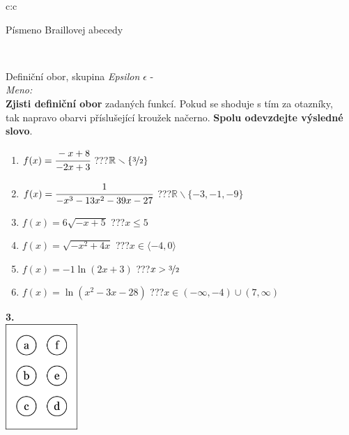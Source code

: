 \documentclass[10pt]{report}
\begin{document}
\begin{tabular}{c:c}
\begin{minipage}[c][99mm][t]{0.49\linewidth}
\begin{center}
\begin{minipage}{0.20\linewidth}
\begin{center}
{\small Písmeno Braillovej abecedy}
\end{center}
\end{minipage}
\end{center}
\end{minipage}
\\ \hdashline
\begin{minipage}[c][99mm][t]{0.49\linewidth}
\begin{center}
\vspace{7mm}
{\huge Definiční obor, skupina \textit{Epsilon $\epsilon$} -}\\[4.5mm]
\textit{Meno:}\phantom{xxxxxxxxxxxxxxxxxxxxxxxxxxxxxxxxxxxxxxxxxxxxxxxxxxxxxxxxxxxxxxxxx}\\[3.5mm]
\textbf{Zjisti definiční obor} zadaných funkcí. Pokud se shoduje s tím za otazníky,\\tak napravo obarvi příslušející kroužek načerno. \textbf{Spolu odevzdejte výsledné slovo}.\\[3mm]
\begin{minipage}{0.77\linewidth}
\begin{center}
\begin{varwidth}{\textwidth}
\begin{enumerate}
\normalsize
\item $f(x)=\cfrac{-x+8}{-2x+3}$\quad \dotfill\; ???\;\dotfill \quad $\mathbb{R}\smallsetminus\{\nicefrac{3}{2}\}$
\item $f(x)=\cfrac{1}{-x^3-13x^2-39x-27}$\quad \dotfill\; ???\;\dotfill \quad $\mathbb{R}\smallsetminus\{-3,-1,-9\}$
\item $f(x)=6\sqrt{-x+5}$\quad \dotfill\; ???\;\dotfill \quad $x\leq5$
\item $f(x)=\sqrt{-x^2+4x}$\quad \dotfill\; ???\;\dotfill \quad $x\in\langle-4 , 0\rangle$
\item $f(x)=-1\ln{(2x+3)}$\quad \dotfill\; ???\;\dotfill \quad $x>\nicefrac{3}{2}$
\item $f(x)=\ln{(x^2-3x-28)}$\quad \dotfill\; ???\;\dotfill \quad $x\in(-\infty , -4)\cup(7 , \infty)$
\end{enumerate}
\end{varwidth}
\end{center}
\end{minipage}
\begin{minipage}{0.20\linewidth}
\begin{center}
{\Huge\bfseries 3.} \\[2mm]
\includegraphics[height=40mm]{../images/braille.png}

\end{center}
\end{minipage}
\end{center}
\end{minipage}
\end{tabular}
\end{document}
